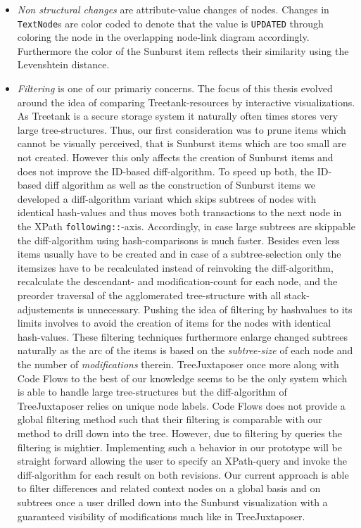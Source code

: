 \begin{itemize}
\item \emph{Non structural changes} are attribute-value changes of nodes. Changes in \texttt{TextNode}s are color coded to denote that the value is \texttt{UPDATED} through coloring the node in the overlapping node-link diagram accordingly. Furthermore the color of the Sunburst item reflects their similarity using the Levenshtein distance.
\item \emph{Filtering} is one of our primariy concerns. The focus of this thesis evolved around the idea of comparing Treetank-resources by interactive visualizations. As Treetank is a secure storage system it naturally often times stores very large tree-structures. Thus, our first consideration was to prune items which cannot be visually perceived, that is Sunburst items which are too small are not created. However this only affects the creation of Sunburst items and does not improve the ID-based diff-algorithm. To speed up both, the ID-based diff algorithm as well as the construction of Sunburst items we developed a diff-algorithm variant which skips subtrees of nodes with identical hash-values and thus moves both transactions to the next node in the XPath \texttt{following::}-axis. Accordingly, in case large subtrees are skippable the diff-algorithm using hash-comparisons is much faster. Besides even less items usually have to be created and in case of a subtree-selection only the itemsizes have to be recalculated instead of reinvoking the diff-algorithm, recalculate the descendant- and modification-count for each node, and the preorder traversal of the agglomerated tree-structure with all stack-adjustements is unnecessary. Pushing the idea of filtering by hashvalues to its limits involves to avoid the creation of items for the nodes with identical hash-values. These filtering techniques furthermore enlarge changed subtrees naturally as the arc of the items is based on the \emph{subtree-size} of each node and the number of \emph{modifications} therein. TreeJuxtaposer once more along with Code Flows to the best of our knowledge seems to be the only system which is able to handle large tree-structures but the diff-algorithm of TreeJuxtaposer relies on unique node labels. Code Flows does not provide a global filtering method such that their filtering is comparable with our method to drill down into the tree. However, due to filtering by queries the filtering is mightier. Implementing such a behavior in our prototype will be straight forward allowing the user to specify an XPath-query and invoke the diff-algorithm for each result on both revisions. Our current approach is able to filter differences and related context nodes on a global basis and on subtrees once a user drilled down into the Sunburst visualization with a guaranteed visibility of modifications much like in TreeJuxtaposer.
\end{itemize}

